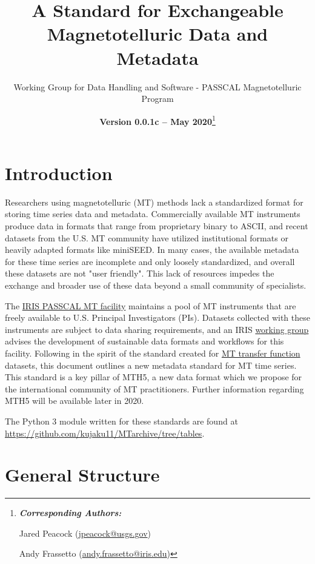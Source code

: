 \documentclass{article}
\title{A Standard for Exchangeable Magnetotelluric Data and Metadata}
\date{\textbf{Version 0.0.1c -- May 2020}\footnote{\noindent\textbf{\textit{Corresponding Authors:}}
		
		Jared Peacock (\url{jpeacock@usgs.gov})
		
		Andy Frassetto (\url{andy.frassetto@iris.edu})}}
\author[1]{Working Group for Data Handling and Software - PASSCAL Magnetotelluric Program}
\affil[1]{Portable Array Seismic Studies of the Continental Lithosphere, Incorporated Research Institutions for Seismology}
\begin{document}
	
\maketitle

\tableofcontents
\vspace{1cm}



%
%
\newpage

\section{Introduction}

Researchers using magnetotelluric (MT) methods lack a standardized format for storing time series data and metadata. Commercially available MT instruments produce data in formats that range from proprietary binary to ASCII, and recent datasets from the U.S. MT community have utilized institutional formats or heavily adapted formats like miniSEED. In many cases, the available metadata for these time series are incomplete and only loosely standardized, and overall these datasets are not "user friendly". This lack of resources impedes the exchange and broader use of these data beyond a small community of specialists.

The \href{https://www.iris.edu/hq/programs/passcal/magnetotelluricnstrumentation}{IRIS PASSCAL MT facility} maintains a pool of MT instruments that are freely available to U.S. Principal Investigators (PIs). Datasets collected with these instruments are subject to data sharing requirements, and an IRIS \href{https://www.iris.edu/hq/aboutris/governance/mtoft}{working group} advises the development of sustainable data formats and workflows for this facility. Following in the spirit of the standard created for \href{https://library.seg.org/doi/10.1190/geo2018-0679.1}{MT transfer function} datasets, this document outlines a new metadata standard for MT time series. This standard is a key pillar of MTH5, a new data format which we propose for the international community of MT practitioners. Further information regarding MTH5 will be available later in 2020.

The Python 3 module written for these standards are found at \url{https://github.com/kujaku11/MTarchive/tree/tables}.

\section{General Structure}
\end{document}
